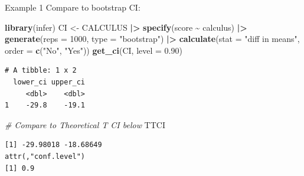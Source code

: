 \documentclass[
  ignorenonframetext,
]{beamer}
\newenvironment{Shaded}{\begin{snugshade}}{\end{snugshade}}
\newcommand{\AttributeTok}[1]{\textcolor[rgb]{0.13,0.29,0.53}{#1}}
\newcommand{\CommentTok}[1]{\textcolor[rgb]{0.56,0.35,0.01}{\textit{#1}}}
\newcommand{\DecValTok}[1]{\textcolor[rgb]{0.00,0.00,0.81}{#1}}
\newcommand{\FloatTok}[1]{\textcolor[rgb]{0.00,0.00,0.81}{#1}}
\newcommand{\FunctionTok}[1]{\textcolor[rgb]{0.13,0.29,0.53}{\textbf{#1}}}
\newcommand{\NormalTok}[1]{#1}
\newcommand{\OtherTok}[1]{\textcolor[rgb]{0.56,0.35,0.01}{#1}}
\newcommand{\SpecialCharTok}[1]{\textcolor[rgb]{0.81,0.36,0.00}{\textbf{#1}}}
\newcommand{\StringTok}[1]{\textcolor[rgb]{0.31,0.60,0.02}{#1}}
\begin{document}
\begin{frame}[fragile]{Example 1}
\label{example-1-4}
Compare to bootstrap CI: \tiny

\begin{Shaded}
\begin{Highlighting}[]
\FunctionTok{library}\NormalTok{(infer)}
\NormalTok{CI }\OtherTok{\textless{}{-}}\NormalTok{ CALCULUS }\SpecialCharTok{|\textgreater{}} 
  \FunctionTok{specify}\NormalTok{(score }\SpecialCharTok{\textasciitilde{}}\NormalTok{ calculus) }\SpecialCharTok{|\textgreater{}} 
  \FunctionTok{generate}\NormalTok{(}\AttributeTok{reps =} \DecValTok{1000}\NormalTok{, }\AttributeTok{type =} \StringTok{"bootstrap"}\NormalTok{) }\SpecialCharTok{|\textgreater{}} 
  \FunctionTok{calculate}\NormalTok{(}\AttributeTok{stat =} \StringTok{"diff in means"}\NormalTok{, }\AttributeTok{order =} \FunctionTok{c}\NormalTok{(}\StringTok{"No"}\NormalTok{, }\StringTok{"Yes"}\NormalTok{))}
\FunctionTok{get\_ci}\NormalTok{(CI, }\AttributeTok{level =} \FloatTok{0.90}\NormalTok{)}
\end{Highlighting}
\end{Shaded}

\begin{verbatim}
# A tibble: 1 x 2
  lower_ci upper_ci
     <dbl>    <dbl>
1    -29.8    -19.1
\end{verbatim}

\begin{Shaded}
\begin{Highlighting}[]
\CommentTok{\# Compare to Theoretical T CI below}
\NormalTok{TTCI}
\end{Highlighting}
\end{Shaded}

\begin{verbatim}
[1] -29.98018 -18.68649
attr(,"conf.level")
[1] 0.9
\end{verbatim}

\normalsize
\end{frame}
\end{document}
